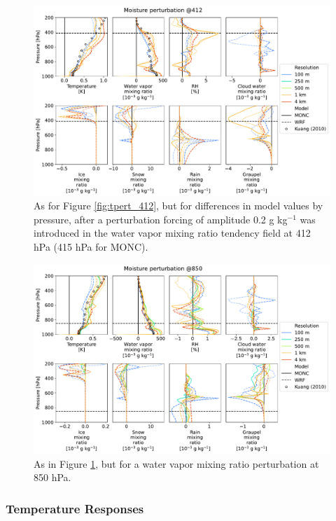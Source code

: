 \documentclass[draft]{agujournal2019}
\begin{document}
\begin{figure}[pth]
    \noindent\includegraphics[width=\textwidth]{figures/pert_diffs_q_0.0002_@412}
    \caption{As for Figure \ref{fig:tpert_412}, but for differences in model
    values by pressure, after a perturbation forcing of amplitude 0.2 g
    kg$^{-1}$ was introduced in the water vapor mixing ratio tendency field at
    412 hPa (415 hPa for MONC).}
    \label{fig:qpert_412}
\end{figure}

\begin{figure}[pth]
    \noindent\includegraphics[width=\textwidth]{figures/pert_diffs_q_0.0002_@850}
    \caption{As in Figure \ref{fig:qpert_412}, but for a water vapor mixing
    ratio perturbation at 850 hPa.}
    \label{fig:qpert_850}
\end{figure}

\subsubsection{Temperature Responses}
\end{document}
